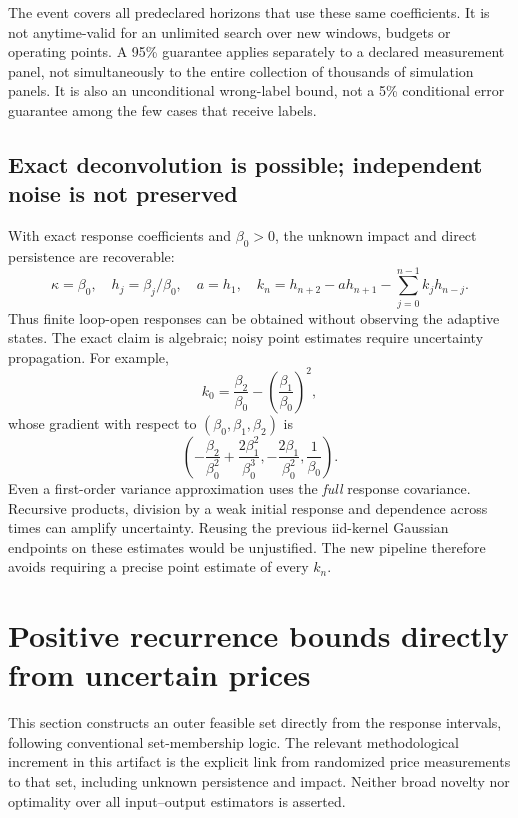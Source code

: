 \documentclass[11pt,a4paper]{article}
\theoremstyle{definition}
\theoremstyle{remark}
\begin{document}
The event covers all predeclared horizons that use these same coefficients. It is not anytime-valid for an unlimited search over new windows, budgets or operating points. A 95\% guarantee applies separately to a declared measurement panel, not simultaneously to the entire collection of thousands of simulation panels. It is also an unconditional wrong-label bound, not a 5\% conditional error guarantee among the few cases that receive labels.

\subsection{Exact deconvolution is possible; independent noise is not preserved}
With exact response coefficients and $\beta_0>0$, the unknown impact and direct persistence are recoverable:
\begin{equation}
 \kappa=\beta_0,\quad h_j=\beta_j/\beta_0,\quad a=h_1,\quad
 k_n=h_{n+2}-a h_{n+1}-\sum_{j=0}^{n-1}k_jh_{n-j}.
 \label{eq:observable_deconvolution}
\end{equation}
Thus finite loop-open responses can be obtained without observing the adaptive states. The exact claim is algebraic; noisy point estimates require uncertainty propagation. For example,
\[
 k_0=\frac{\beta_2}{\beta_0}-\left(\frac{\beta_1}{\beta_0}\right)^2,
\]
whose gradient with respect to $(\beta_0,\beta_1,\beta_2)$ is
\[
 \left(-\frac{\beta_2}{\beta_0^2}+\frac{2\beta_1^2}{\beta_0^3},
 -\frac{2\beta_1}{\beta_0^2},\frac1{\beta_0}\right).
\]
Even a first-order variance approximation uses the \emph{full} response covariance. Recursive products, division by a weak initial response and dependence across times can amplify uncertainty. Reusing the previous iid-kernel Gaussian endpoints on these estimates would be unjustified. The new pipeline therefore avoids requiring a precise point estimate of every $k_n$.

\section{Positive recurrence bounds directly from uncertain prices}
\label{sec:observable_bounds}
This section constructs an outer feasible set directly from the response intervals, following conventional set-membership logic. The relevant methodological increment in this artifact is the explicit link from randomized price measurements to that set, including unknown persistence and impact. Neither broad novelty nor optimality over all input--output estimators is asserted.
\end{document}
